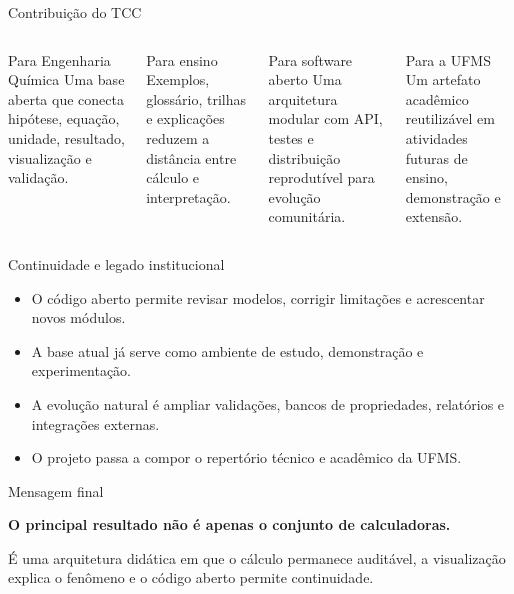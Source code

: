 
\begin{frame}{Contribuição do TCC}
  \begin{columns}[T,onlytextwidth]
      \begin{block}{Para Engenharia Química}
        Uma base aberta que conecta hipótese, equação, unidade, resultado, visualização e validação.
      \end{block}
      \begin{block}{Para ensino}
        Exemplos, glossário, trilhas e explicações reduzem a distância entre cálculo e interpretação.
      \end{block}
      \begin{block}{Para software aberto}
        Uma arquitetura modular com API, testes e distribuição reprodutível para evolução comunitária.
      \end{block}
      \begin{block}{Para a UFMS}
        Um artefato acadêmico reutilizável em atividades futuras de ensino, demonstração e extensão.
      \end{block}
  \end{columns}
\end{frame}

\begin{frame}{Continuidade e legado institucional}
  \begin{itemize}
    \item O código aberto permite revisar modelos, corrigir limitações e acrescentar novos módulos.
    \item A base atual já serve como ambiente de estudo, demonstração e experimentação.
    \item A evolução natural é ampliar validações, bancos de propriedades, relatórios e integrações externas.
    \item O projeto passa a compor o repertório técnico e acadêmico da UFMS.
  \end{itemize}
\end{frame}

\begin{frame}{Mensagem final}
  \begin{center}
    {\Large\color{dcoublue}\textbf{O principal resultado não é apenas o conjunto de calculadoras.}\par}
    \vspace{0.8em}
    {\large É uma arquitetura didática em que o cálculo permanece auditável, a visualização explica o fenômeno e o código aberto permite continuidade.\par}
  \end{center}
\end{frame}

